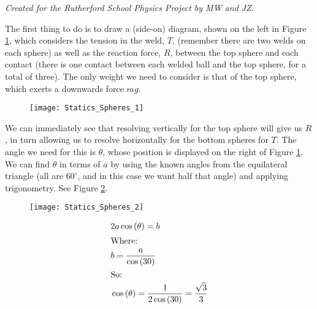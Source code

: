 \begin{problem}
{
}
{\textit{Created for the Rutherford School Physics Project by MW and JZ.}}
{
The first thing to do is to draw a (side-on) diagram, shown on the left in Figure \ref{fig:Statics_Spheres_1}, which considers the tension in the weld, $T$, (remember there are two welds on each sphere) as well as the reaction force, $R$, between the top sphere and each contact (there is one contact between each welded ball and the top sphere, for a total of three). The only weight we need to consider is that of the top sphere, which exerts a downwards force $mg$.

\begin{figure}[h]
	\centering
	\texttt{[image: Statics\_Spheres\_1]}
	\caption{}	
	\label{fig:Statics_Spheres_1}
\end{figure}

We can immediately see that resolving vertically for the top sphere will give us $R$, in turn allowing us to resolve horizontally for the bottom spheres for $T$. The angle we need for this is $\theta$, whose position is displayed on the right of Figure \ref{fig:Statics_Spheres_1}. We can find $\theta$ in terms of $a$ by using the known angles from the equilateral triangle (all are $60 ^{\circ}$, and in this case we want half that angle) and applying trigonometry. See Figure \ref{fig:Statics_Spheres_2}. 

\begin{figure}[h]
	\centering
	\texttt{[image: Statics\_Spheres\_2]}
	\caption{}	
	\label{fig:Statics_Spheres_2}
\end{figure}

\begin{align*} &2a\cos{(\theta)} = b \\
\intertext{Where:}& b = \frac{a}{\cos{(30)}} \\
\intertext{So:} &\cos{(\theta)}= \frac{1}{2\cos{(30)}} = \frac{\sqrt{3}}{3}\\ \end{align*}

}
\end{problem}
